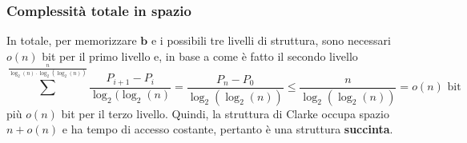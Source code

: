 \subsubsection{Complessità totale in spazio}
In totale, per memorizzare $\mathbf{b}$ e i possibili tre livelli di struttura,
sono necessari $o(n)$ bit per il primo livello e, in base a come è fatto il secondo livello
$$
	\sum^{\frac{n}{\log_2(n)\cdot \log_2(\log_2(n))}} \frac{P_{i+1} - P_i}{\log_2(\log_2(n)}
	= \frac{P_n - P_0}{\log_2(\log_2(n))}
	\leq \frac{n}{\log_2(\log_2(n))} = o(n) \text{ bit}
$$
più $o(n)$ bit per il terzo livello. Quindi, la struttura di Clarke occupa
spazio $n + o(n)$ e ha tempo di accesso costante, pertanto è
una struttura \textbf{succinta}.

\begin{figure}
	\centering

	\begin{tikzpicture}[x=0.75pt,y=0.75pt,yscale=-1,xscale=1]


\end{tikzpicture}
\end{figure}
